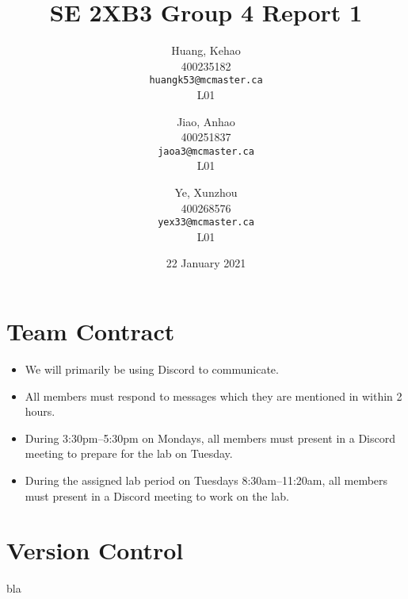 \documentclass[titlepage, 12pt]{article}
\title{SE 2XB3 Group 4 Report 1}
\author{
  Huang, Kehao \\
  400235182 \\
  \texttt{huangk53@mcmaster.ca} \\
  L01
  \and
  Jiao, Anhao \\
  400251837 \\
  \texttt{jaoa3@mcmaster.ca} \\
  L01
  \and
  Ye, Xunzhou \\
  400268576 \\
  \texttt{yex33@mcmaster.ca} \\
  L01
}
\date{22 January 2021}
\begin{document}
\maketitle{}

\section*{Team Contract}
\label{sec:contract}

\begin{itemize}
\item We will primarily be using Discord to communicate.
\item All members must respond to messages which they are mentioned in within 2
  hours.
\item During 3:30pm--5:30pm on Mondays, all members must present in a Discord
  meeting to prepare for the lab on Tuesday.
\item During the assigned lab period on Tuesdays 8:30am--11:20am, all members
  must present in a Discord meeting to work on the lab.
\end{itemize}

\newpage{}

\section{Version Control}
\label{sec:git}

bla
\end{document}
